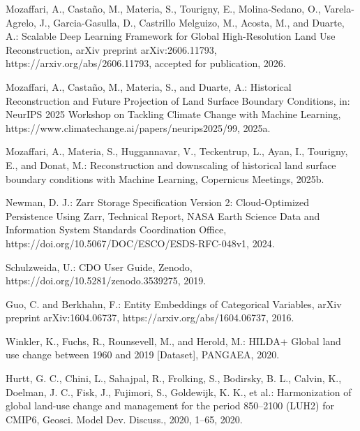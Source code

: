 \begin{thebibliography}{}


Mozaffari, A., Casta{\~n}o, M., Materia, S., Tourigny, E., Molina-Sedano, O.,
Varela-Agrelo, J., Garcia-Gasulla, D., Castrillo Melguizo, M., Acosta, M., and
Duarte, A.: Scalable Deep Learning Framework for Global High-Resolution Land
Use Reconstruction, arXiv preprint arXiv:2606.11793,
https://arxiv.org/abs/2606.11793, accepted for publication, 2026.

Mozaffari, A., Casta{\~n}o, M., Materia, S., and Duarte, A.: Historical
Reconstruction and Future Projection of Land Surface Boundary Conditions, in:
NeurIPS 2025 Workshop on Tackling Climate Change with Machine Learning,
https://www.climatechange.ai/papers/neurips2025/99, 2025a.

Mozaffari, A., Materia, S., Huggannavar, V., Teckentrup, L., Ayan, I.,
Tourigny, E., and Donat, M.: Reconstruction and downscaling of historical land
surface boundary conditions with Machine Learning, Copernicus Meetings, 2025b.


Newman, D. J.: Zarr Storage Specification Version 2: Cloud-Optimized
Persistence Using Zarr, Technical Report, NASA Earth Science Data and
Information System Standards Coordination Office,
https://doi.org/10.5067/DOC/ESCO/ESDS-RFC-048v1, 2024.

Schulzweida, U.: CDO User Guide, Zenodo,
https://doi.org/10.5281/zenodo.3539275, 2019.

Guo, C. and Berkhahn, F.: Entity Embeddings of Categorical Variables, arXiv
preprint arXiv:1604.06737, https://arxiv.org/abs/1604.06737, 2016.


Winkler, K., Fuchs, R., Rounsevell, M., and Herold, M.: HILDA+ Global land use
change between 1960 and 2019 [Dataset], PANGAEA, 2020.

Hurtt, G. C., Chini, L., Sahajpal, R., Frolking, S., Bodirsky, B. L., Calvin,
K., Doelman, J. C., Fisk, J., Fujimori, S., Goldewijk, K. K., et al.:
Harmonization of global land-use change and management for the period
850--2100 (LUH2) for CMIP6, Geosci. Model Dev. Discuss., 2020, 1--65, 2020.


\end{thebibliography}
